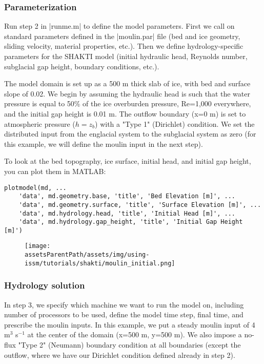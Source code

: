 \subsubsection{Parameterization}
Run step 2 in \lstinlinebg|runme.m| to define the model parameters. First we call on standard parameters defined in the \lstinlinebg|moulin.par| file (bed and ice geometry, sliding velocity, material properties, etc.). Then we define hydrology-specific parameters for the SHAKTI model (initial hydraulic head, Reynolds number, subglacial gap height, boundary conditions, etc.).

The model domain is set up as a 500 m thick slab of ice, with bed and surface slope of 0.02. We begin by assuming the hydraulic head is such that the water pressure is equal to 50\% of the ice overburden pressure, Re=1,000 everywhere, and the initial gap height is 0.01 m. The outflow boundary (x=0 m) is set to atmospheric pressure ($h=z_b$) with a "Type 1" (Dirichlet) condition. We set the distributed input from the englacial system to the subglacial system as zero (for this example, we will define the moulin input in the next step).

To look at the bed topography, ice surface, initial head, and initial gap height, you can plot them in MATLAB:
\begin{lstlisting}
plotmodel(md, ...
	'data', md.geometry.base, 'title', 'Bed Elevation [m]', ...
	'data', md.geometry.surface, 'title', 'Surface Elevation [m]', ...
	'data', md.hydrology.head, 'title', 'Initial Head [m]', ...
	'data', md.hydrology.gap_height, 'title', 'Initial Gap Height [m]')
\end{lstlisting}

\begin{figure}[H]
	\begin{center}
		\texttt{[image: \\assetsParentPath/assets/img/using-issm/tutorials/shakti/moulin\_initial.png]}
	\end{center}
\end{figure}

\subsubsection{Hydrology solution}
In step 3, we specify which machine we want to run the model on, including number of processors to be used, define the model time step, final time, and prescribe the moulin inputs. In this example, we put a steady moulin input of 4 m$^3$ s$^{-1}$ at the center of the domain (x=500 m, y=500 m). We also impose a no-flux "Type 2" (Neumann) boundary condition at all boundaries (except the outflow, where we have our Dirichlet condition defined already in step 2).

